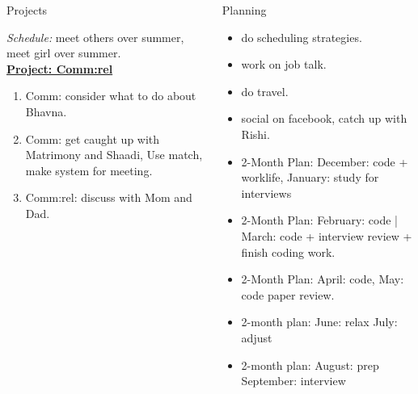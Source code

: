 \documentclass[serif, mathserif, final]{beamer}
\newcommand{\comments}[1]{}
\begin{document}
\begin{frame}
\begin{columns}
\begin{column}{0.5\textwidth}
\begin{block}{Projects}
\begin{enumerate}
\end{enumerate}
{\it Schedule:} meet others over summer, meet girl over summer.\\

{\underline{\textbf{Project: Comm:rel}}}
\begin{enumerate} 
  \tiny \item \tiny Comm: consider what to do about Bhavna.
\item \tiny Comm: get caught up with Matrimony and Shaadi, Use match,
  make system for meeting. 
\item \tiny Comm:rel: discuss with Mom and Dad. 
\end{enumerate} 
\end{block} 
\end{column} 

\begin{column}{0.5\textwidth}
\begin{block}{Planning} 
\comments{
{\underline{\textit{2-month plans}}}
{\underline{\textit{January and February:}}}
{\underline{\textit{March and April:}} }
{\underline{\textit{May and June:}}}
}

\begin{itemize}
\tiny \item \tiny do scheduling strategies. 
\item \tiny work on job talk. 
\item \tiny do travel. 
\item \tiny social on facebook, catch up with Rishi. 
\end{itemize} 
\begin{itemize} 
\tiny \item \tiny 2-Month Plan: December: code + worklife, January: study for interviews
\item \tiny 2-Month Plan: February: code | March:  code + interview review + finish coding work. 
\item \tiny 2-Month Plan: April: code, May: code paper review.
\item \tiny 2-month plan: June: relax July: adjust 
\item \tiny 2-month plan: August:  prep September: interview 
\end{itemize}




\comments{
\underline{{\bf Week of March $22^{nd}$:}} 
\begin{itemize}
\small \item \small saving state.
\item \small adjust static fraction / make weights.
\item \small other
\item \small plan for someone to pick this up later.
\end{itemize}
}


\end{block}
\end{column}
\end{columns}
\end{frame}
\end{document}
